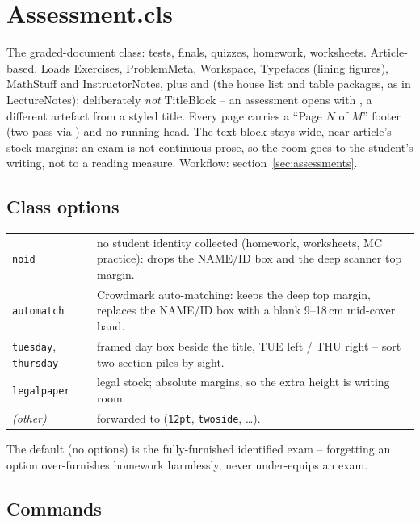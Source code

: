 \section{Assessment.cls}\label{sec:ref-assessment}

The graded-document class: tests, finals, quizzes, homework, worksheets.
Article-based. Loads Exercises, ProblemMeta, Workspace, Typefaces (lining
figures), MathStuff and InstructorNotes, plus  and
 (the house list and table packages, as in LectureNotes);
deliberately \emph{not} TitleBlock --
an assessment opens with , a different artefact from a
styled title. Every page carries a ``Page $N$ of $M$'' footer (two-pass via
) and no running head. The text block stays wide, near
article's stock margins: an exam is not continuous prose, so the room goes
to the student's writing, not to a reading measure. Workflow:
section~\ref{sec:assessments}.

\subsection*{Class options}

\begin{center}
\begin{tabularx}{\linewidth}{@{}l Y@{}}
\texttt{noid} & no student identity collected (homework, worksheets, MC
  practice): drops the NAME/ID box and the deep scanner top margin.\\
\texttt{automatch} & Crowdmark auto-matching: keeps the deep top margin,
  replaces the NAME/ID box with a blank 9--18\,cm mid-cover band.\\
\texttt{tuesday}, \texttt{thursday} & framed day box beside the title, TUE
  left / THU right -- sort two section piles by sight.\\
\texttt{legalpaper} & legal stock; absolute margins, so the extra height is
  writing room.\\
\emph{(other)} & forwarded to  (\texttt{12pt},
  \texttt{twoside}, \dots).\\
\end{tabularx}
\end{center}

The default (no options) is the fully-furnished identified exam --
forgetting an option over-furnishes homework harmlessly, never under-equips
an exam.

\subsection*{Commands}

